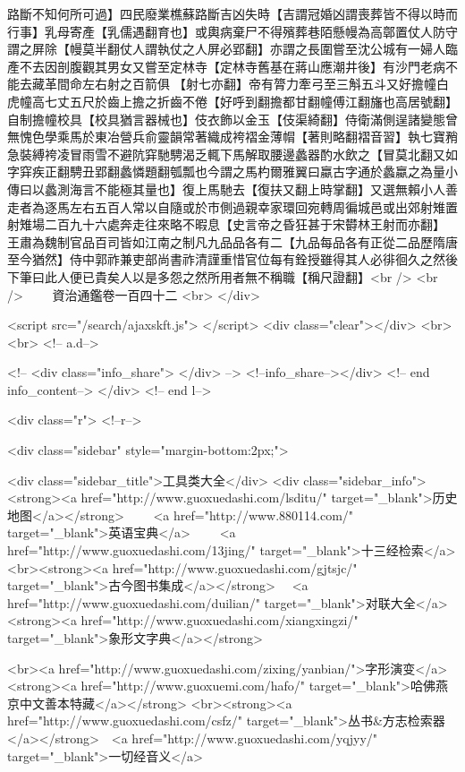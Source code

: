 路斷不知何所可過】四民廢業樵蘇路斷吉凶失時【吉謂冠婚凶謂喪葬皆不得以時而行事】乳母寄產【乳儒遇翻育也】或輿病棄尸不得殯葬巷陌懸幔為高鄣置仗人防守謂之屏除【幔莫半翻仗人謂執仗之人屏必郢翻】亦謂之長圍嘗至沈公城有一婦人臨產不去因剖腹觀其男女又嘗至定林寺【定林寺舊基在蔣山應潮井後】有沙門老病不能去藏革間命左右射之百箭俱【射七亦翻】帝有膂力牽弓至三斛五斗又好擔幢白虎幢高七丈五尺於齒上擔之折齒不倦【好呼到翻擔都甘翻幢傅江翻旛也高居號翻】自制擔幢校具【校具猶言器械也】伎衣飾以金玉【伎渠綺翻】侍衛滿側逞諸變態曾無愧色學乘馬於東冶營兵俞靈韻常著織成袴褶金薄㡌【著則略翻褶音習】執七寶矟急裝縛袴凌冒雨雪不避阬穽馳騁渴乏輒下馬解取腰邊蠡器酌水飲之【冒莫北翻又如字穽疾正翻騁丑郢翻蠡憐題翻瓠瓢也今謂之馬杓爾雅翼曰蠃古字通於蠡蠃之為量小傳曰以蠡測海言不能極其量也】復上馬馳去【復扶又翻上時掌翻】又選無賴小人善走者為逐馬左右五百人常以自隨或於市側過親幸家環回宛轉周徧城邑或出郊射雉置射雉場二百九十六處奔走往來略不暇息【史言帝之昏狂甚于宋欎林王射而亦翻】　王肅為魏制官品百司皆如江南之制凡九品品各有二【九品每品各有正從二品歷隋唐至今猶然】侍中郭祚兼吏部尚書祚清謹重惜官位每有銓授雖得其人必徘徊久之然後下筆曰此人便已貴矣人以是多怨之然所用者無不稱職【稱尺證翻】<br />
<br />
　　資治通鑑卷一百四十二  <br>
   </div> 

<script src="/search/ajaxskft.js"> </script>
 <div class="clear"></div>
<br>
<br>
 <!-- a.d-->

 <!--
<div class="info_share">
</div> 
-->
 <!--info_share--></div>   <!-- end info_content-->
  </div> <!-- end l-->

<div class="r">   <!--r-->



<div class="sidebar"  style="margin-bottom:2px;">

 
<div class="sidebar_title">工具类大全</div>
<div class="sidebar_info">
<strong><a href="http://www.guoxuedashi.com/lsditu/" target="_blank">历史地图</a></strong>　　
<a href="http://www.880114.com/" target="_blank">英语宝典</a>　　
<a href="http://www.guoxuedashi.com/13jing/" target="_blank">十三经检索</a>　
<br><strong><a href="http://www.guoxuedashi.com/gjtsjc/" target="_blank">古今图书集成</a></strong>　
<a href="http://www.guoxuedashi.com/duilian/" target="_blank">对联大全</a>　<strong><a href="http://www.guoxuedashi.com/xiangxingzi/" target="_blank">象形文字典</a></strong>　

<br><a href="http://www.guoxuedashi.com/zixing/yanbian/">字形演变</a>　　<strong><a href="http://www.guoxuemi.com/hafo/" target="_blank">哈佛燕京中文善本特藏</a></strong>
<br><strong><a href="http://www.guoxuedashi.com/csfz/" target="_blank">丛书&方志检索器</a></strong>　<a href="http://www.guoxuedashi.com/yqjyy/" target="_blank">一切经音义</a>　　

